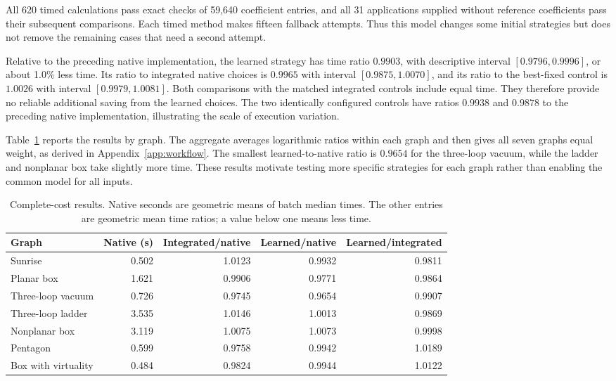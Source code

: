 All 620 timed calculations pass exact checks of 59,640 coefficient entries, and all 31 applications supplied without reference coefficients pass their subsequent comparisons. Each timed method makes fifteen fallback attempts. Thus this model changes some initial strategies but does not remove the remaining cases that need a second attempt.

Relative to the preceding native implementation, the learned strategy has time ratio $0.9903$, with descriptive interval $[0.9796,0.9996]$, or about 1.0\% less time. Its ratio to integrated native choices is $0.9965$ with interval $[0.9875,1.0070]$, and its ratio to the best-fixed control is $1.0026$ with interval $[0.9979,1.0081]$. Both comparisons with the matched integrated controls include equal time. They therefore provide no reliable additional saving from the learned choices. The two identically configured controls have ratios $0.9938$ and $0.9878$ to the preceding native implementation, illustrating the scale of execution variation.

Table~\ref{tab:workflow-times} reports the results by graph. The aggregate averages logarithmic ratios within each graph and then gives all seven graphs equal weight, as derived in Appendix~\ref{app:workflow}. The smallest learned-to-native ratio is $0.9654$ for the three-loop vacuum, while the ladder and nonplanar box take slightly more time. These results motivate testing more specific strategies for each graph rather than enabling the common model for all inputs.

\begin{table}[!htbp]
\centering\small
\caption{Complete-cost results. Native seconds are geometric means of
batch median times. The other entries are geometric mean time ratios;
a value below one means less time.}
\label{tab:workflow-times}
\begin{tabular}{@{}lrrrr@{}}\toprule
Graph & Native (s) & Integrated/native & Learned/native & Learned/integrated\\\midrule
Sunrise & 0.502 & 1.0123 & 0.9932 & 0.9811\\
Planar box & 1.621 & 0.9906 & 0.9771 & 0.9864\\
Three-loop vacuum & 0.726 & 0.9745 & 0.9654 & 0.9907\\
Three-loop ladder & 3.535 & 1.0146 & 1.0013 & 0.9869\\
Nonplanar box & 3.119 & 1.0075 & 1.0073 & 0.9998\\
Pentagon & 0.599 & 0.9758 & 0.9942 & 1.0189\\
Box with virtuality & 0.484 & 0.9824 & 0.9944 & 1.0122\\
\bottomrule
\end{tabular}
\end{table}

